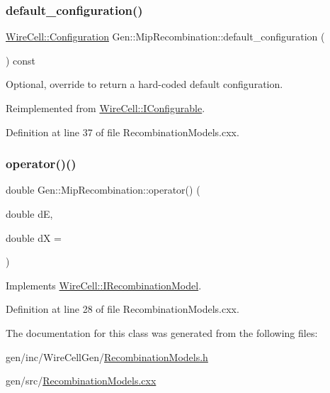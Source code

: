 \subsubsection{\texorpdfstring{default\+\_\+configuration()}{default\_configuration()}}
{\footnotesize\ttfamily \hyperlink{namespace_wire_cell_a9f705541fc1d46c608b3d32c182333ee}{Wire\+Cell\+::\+Configuration} Gen\+::\+Mip\+Recombination\+::default\+\_\+configuration (\begin{DoxyParamCaption}{ }\end{DoxyParamCaption}) const\hspace{0.3cm}{\ttfamily [virtual]}}



Optional, override to return a hard-\/coded default configuration. 



Reimplemented from \hyperlink{class_wire_cell_1_1_i_configurable_a54841b2da3d1ea02189478bff96f7998}{Wire\+Cell\+::\+I\+Configurable}.



Definition at line 37 of file Recombination\+Models.\+cxx.

\mbox{\label{class_wire_cell_1_1_gen_1_1_mip_recombination_a894a0a8bfb306444d2cecfb3340e35c9}} 
\subsubsection{\texorpdfstring{operator()()}{operator()()}}
{\footnotesize\ttfamily double Gen\+::\+Mip\+Recombination\+::operator() (\begin{DoxyParamCaption}\item[{double}]{dE,  }\item[{double}]{dX = {} }\end{DoxyParamCaption})\hspace{0.3cm}{\ttfamily [virtual]}}



Implements \hyperlink{class_wire_cell_1_1_i_recombination_model_a600558009b672e93219962f364829e00}{Wire\+Cell\+::\+I\+Recombination\+Model}.



Definition at line 28 of file Recombination\+Models.\+cxx.



The documentation for this class was generated from the following files\+:\begin{DoxyCompactItemize}
\item 
gen/inc/\+Wire\+Cell\+Gen/\hyperlink{_recombination_models_8h}{Recombination\+Models.\+h}\item 
gen/src/\hyperlink{_recombination_models_8cxx}{Recombination\+Models.\+cxx}\end{DoxyCompactItemize}
